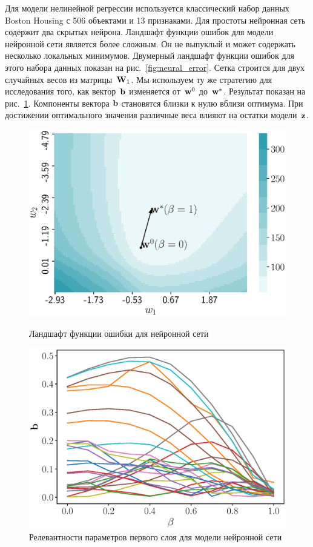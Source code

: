 Для модели нелинейной регрессии используется классический набор данных Boston Housing с 506 объектами и 13 признаками.
Для простоты нейронная сеть содержит два скрытых нейрона.
Ландшафт функции ошибок для модели нейронной сети является более сложным. 
Он не выпуклый и может содержать несколько локальных минимумов.
Двумерный ландшафт функции ошибок для этого набора данных показан на рис.~\ref{fig:neural_error}. 
Сетка строится для двух случайных весов из матрицы~$\mathbf{W}_1$.
Мы используем ту же стратегию для исследования того, как вектор~$\mathbf{b}$ изменяется от~$\mathbf{w}^0$ до~$\mathbf{w}^*$. 
Результат показан на рис.~\ref{fig:neural_b_wrt_beta}.
Компоненты вектора $\mathbf{b}$ становятся близки к нулю вблизи оптимума. 
При достижении оптимального значения различные веса влияют на остатки модели~$\mathbf{z}$.
\begin{figure}
	\centering
	\begin{minipage}{.5\textwidth}
		\centering
		\includegraphics[width=\linewidth]{figs/ch3/neural_error}
		\caption{Ландшафт функции ошибки для нейронной сети}
		\label{fig:neural_error}
	\end{minipage}%
	\begin{minipage}{.5\textwidth}
		\centering
		\includegraphics[width=\linewidth]{figs/ch3/neural_b_wrt_beta}
		\caption{Релевантности параметров первого слоя для модели нейронной сети}
		\label{fig:neural_b_wrt_beta}
	\end{minipage}
\end{figure}

